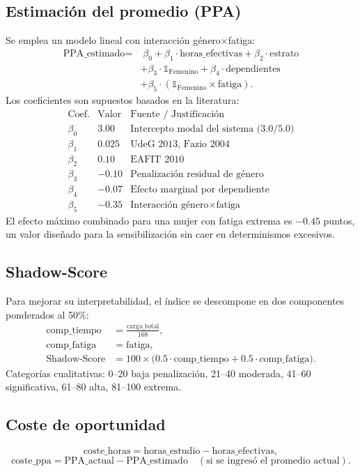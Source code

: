 \documentclass[12pt, spanish]{article}
\begin{document}
\subsection{Estimación del promedio (PPA)}
Se emplea un modelo lineal con interacción género\(\times\)fatiga:
\[
\begin{aligned}
\text{PPA\_estimado} = &\; \beta_0 + \beta_1 \cdot \text{horas\_efectivas} + \beta_2 \cdot \text{estrato} \\
&+ \beta_3 \cdot \mathbb{1}_{\text{Femenino}} + \beta_4 \cdot \text{dependientes} \\
&+ \beta_5 \cdot (\mathbb{1}_{\text{Femenino}} \times \text{fatiga}).
\end{aligned}
\]
Los coeficientes son supuestos basados en la literatura:
\[
\begin{array}{c|c|l}
\text{Coef.} & \text{Valor} & \text{Fuente / Justificación} \\ \hline
\beta_0 & 3.00 & \text{Intercepto modal del sistema (3.0/5.0)} \\
\beta_1 & 0.025 & \text{UdeG 2013, Fazio 2004} \\
\beta_2 & 0.10 & \text{EAFIT 2010} \\
\beta_3 & -0.10 & \text{Penalización residual de género} \\
\beta_4 & -0.07 & \text{Efecto marginal por dependiente} \\
\beta_5 & -0.35 & \text{Interacción género\(\times\)fatiga}
\end{array}
\]
El efecto máximo combinado para una mujer con fatiga extrema es \(-0.45\) puntos, un valor diseñado para la sensibilización sin caer en determinismos excesivos.

\subsection{Shadow-Score}
Para mejorar su interpretabilidad, el índice se descompone en dos componentes ponderados al 50\%:
\[
\begin{aligned}
\text{comp\_tiempo} &= \frac{\text{carga\_total}}{168}, \\
\text{comp\_fatiga} &= \text{fatiga}, \\
\text{Shadow-Score} &= 100 \times \big(0.5 \cdot \text{comp\_tiempo} + 0.5 \cdot \text{comp\_fatiga}\big).
\end{aligned}
\]
Categorías cualitativas: 0–20 baja penalización, 21–40 moderada, 41–60 significativa, 61–80 alta, 81–100 extrema.

\subsection{Coste de oportunidad}
\[
\text{coste\_horas} = \text{horas\_estudio} - \text{horas\_efectivas},
\]
\[
\text{coste\_ppa} = \text{PPA\_actual} - \text{PPA\_estimado} \quad (\text{si se ingresó el promedio actual}).
\]
\end{document}
